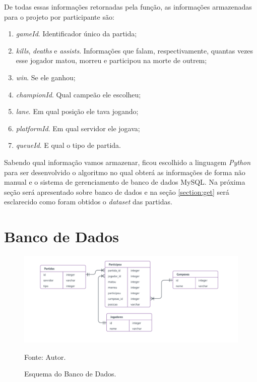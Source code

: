 De todas essas informações retornadas pela função, as informações armazenadas para o projeto por participante são:

\begin{enumerate}
\item \textit{gameId}. Identificador único da partida;
\item \textit{kills}, \textit{deaths} e \textit{assists}. Informações que falam, respectivamente, quantas vezes esse jogador matou, morreu e participou na morte de outrem;
\item \textit{win}. Se ele ganhou;
\item \textit{championId}. Qual campeão ele escolheu;
\item \textit{lane}. Em qual posição ele tava jogando;
\item \textit{platformId}. Em qual servidor ele jogava;
\item \textit{queueId}. E qual o tipo de partida.
\end{enumerate}

Sabendo qual informação vamos armazenar, ficou escolhido a linguagem \textit{Python} para ser desenvolvido o algoritmo no qual obterá as informações de forma não manual e o sistema de gerenciamento de banco de dados MySQL. Na próxima seção será apresentado sobre banco de dados e na seção \ref{section:get} será esclarecido como foram obtidos o \textit{dataset} das partidas. 


\section{Banco de Dados}

\begin{figure}[H]
	\caption{Esquema do Banco de Dados.}
	\begin{center}
		\includegraphics[width=17cm]{imagens/esquema.png}
	\end{center}
	\small{Fonte: Autor.}
	\label{fig:novafigura}
\end{figure}


